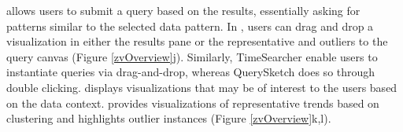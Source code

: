  allows users to submit a query based on the results, essentially asking for patterns similar to the selected data pattern. In \zvpp, users can drag and drop a visualization in either the results pane or the representative and outliers to the query canvas (Figure \ref{zvOverview}j). Similarly, TimeSearcher enable users to instantiate queries via drag-and-drop, whereas QuerySketch does so through double clicking.  %
 displays visualizations that may be of interest to the users based on the data context. \zvpp provides visualizations of representative trends based on clustering and highlights outlier instances (Figure \ref{zvOverview}k,l).%

